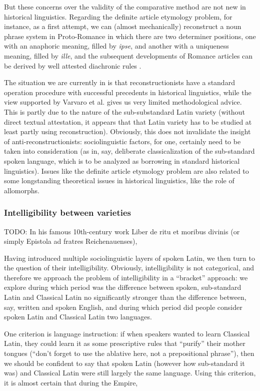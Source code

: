 \documentclass[a4paper, oneside, 12pt]{report}
\newcommand{\form}[1]{\emph{#1}}
\begin{document}
But these concerns over the validity of the comparative method are not new in historical linguistics.
Regarding the definite article etymology problem, for instance, as a first attempt, we can (almost mechanically) reconstruct a noun phrase system in Proto-Romance in which there are two  determiner positions, one with an anaphoric meaning, filled by \form{ipse}, and another with a uniqueness meaning, filled by \form{ille}, and the subsequent developments of Romance articles can be derived by well attested diachronic rules \citep{bernstein2021emphatic}.

The situation we are currently in is that reconstructionists have a standard operation procedure with successful precedents in historical linguistics, while the view supported by Varvaro et al. gives us very limited methodological advice. 
This is partly due to the nature of the sub-substandard Latin variety
(without direct textual attestation, it appears that that Latin variety has to be studied at least partly using reconstruction).
Obviously, this does not invalidate the insight of anti-reconstructionists: sociolinguistic factors, for one, certainly need to be taken into consideration (as in, say, deliberate classicalization of the sub-standard spoken language, which is to be analyzed as borrowing in standard historical linguistics).
Issues like the definite article etymology problem are also related to some longstanding theoretical issues in historical linguistics, like the role of allomorphs.

\subsubsection{Intelligibility between varieties}

TODO: In his famous 10th-century work Liber de ritu et moribus divinis (or simply Epistola ad fratres Reichenauenses), 

Having introduced multiple sociolinguistic layers of spoken Latin, we then turn to the question of their intelligibility.
Obviously, intelligibility is not categorical, and therefore we approach the problem of intelligibility in a ``bracket'' approach:
we explore during which period was the difference between spoken, sub-standard Latin and Classical Latin no significantly stronger than the difference between, say, written and spoken English,
and during which period did people consider spoken Latin and Classical Latin two languages.

One criterion is language instruction: 
if when speakers wanted to learn Classical Latin,
they could learn it as some prescriptive rules that ``purify'' their mother tongues 
(``don't forget to use the ablative here, not a prepositional phrase''),
then we should be confident to say that spoken Latin (however how sub-standard it was) and Classical Latin were still largely the same language.
Using this criterion, it is almost certain that during the Empire, 
\end{document}
